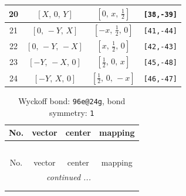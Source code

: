 \documentclass[fleqn,8pt]{jsarticle}
\begin{document}
\begin{longtable}{cccc}
20 & $\left[ X,\, 0,\, Y \right]$ & $\left[ 0,\, x,\, \frac{1}{2} \right]$ & {\tt [38,-39]} \\ \hline
21 & $\left[ 0,\, - Y,\, X \right]$ & $\left[ - x,\, \frac{1}{2},\, 0 \right]$ & {\tt [41,-44]} \\ \hline
22 & $\left[ 0,\, - Y,\, - X \right]$ & $\left[ x,\, \frac{1}{2},\, 0 \right]$ & {\tt [42,-43]} \\ \hline
23 & $\left[ - Y,\, - X,\, 0 \right]$ & $\left[ \frac{1}{2},\, 0,\, x \right]$ & {\tt [45,-48]} \\ \hline
24 & $\left[ - Y,\, X,\, 0 \right]$ & $\left[ \frac{1}{2},\, 0,\, - x \right]$ & {\tt [46,-47]} \\
\end{longtable}
\renewcommand{\arraystretch}{1.2}
\begin{longtable}{cccc}
\caption{Wyckoff bond: {\tt 96e@24g}, bond symmetry: {\tt 1}}
 \\
 \hline \hline
No. & vector & center & mapping \\ \hline \endfirsthead

\multicolumn{3}{l}{\tablename\ \thetable{}} \\
 \hline \hline
No. & vector & center & mapping \\ \hline \endhead

 \hline \hline
\multicolumn{3}{r}{\footnotesize\it continued ...} \\ \endfoot

 \hline \hline
\multicolumn{3}{r}{} \\ \endlastfoot


\end{longtable}
\end{document}
